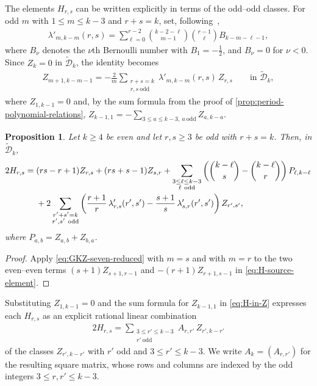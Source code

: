 \documentclass[12pt]{amsart}
\numberwithin{equation}{section}
\theoremstyle{plain}
\newtheorem{prop}[prop]{Proposition}
\newcommand{\odd}{\mathrm{odd}}
\newcommand{\Dtk}{\widetilde{\mathcal D}_k}
\begin{document}
The elements $H_{r,s}$ can be written explicitly in terms of the
odd--odd classes. For odd $m$ with $1\leq m\leq k-3$ and $r+s=k$, set,
following~\cite{GKZ},
\begin{align}\label{eq:lambda-prime}
 \lambda'_{m,k-m}(r,s)
 =\sum_{\ell=0}^{r-2}
 \binom{k-2-\ell}{m-1}\binom{r-1}{\ell}B_{k-m-\ell-1},
\end{align}
where $B_\nu$ denotes the $\nu$th Bernoulli number with
$B_1=-\frac12$, and $B_\nu=0$ for $\nu<0$. Since $Z_k=0$ in $\Dtk$,
the identity \cite[(7)]{GKZ} becomes
\begin{align}\label{eq:GKZ-seven-reduced}
 Z_{m+1,k-m-1}
 =-\frac{2}{m}
 \sum_{\substack{r+s=k\\r,s\ \odd}}
 \lambda'_{m,k-m}(r,s)\,Z_{r,s}
 \qquad\text{in }\Dtk,
\end{align}
where $Z_{1,k-1}=0$ and, by the sum formula from the proof of
\cref{prop:period-polynomial-relations},
$Z_{k-1,1}=-\sum_{3\leq a\leq k-3,\ a\ \odd}Z_{a,k-a}$.

\begin{prop}\label{prop:H-in-Z}
Let $k\geq4$ be even and let $r,s\geq3$ be odd with $r+s=k$. Then, in
$\Dtk$,
\begin{align}\label{eq:H-in-Z}
 2H_{r,s}
 ={}&(rs-r+1)Z_{r,s}+(rs+s-1)Z_{s,r}
 +\sum_{\substack{3\leq\ell\leq k-3\\\ell\ \odd}}
 \left(\binom{k-\ell}{s}-\binom{k-\ell}{r}\right)P_{\ell,k-\ell}
 \notag\\
 &+2\sum_{\substack{r'+s'=k\\r',s'\ \odd}}
 \left(\frac{r+1}{r}\,\lambda'_{r,s}(r',s')
      -\frac{s+1}{s}\,\lambda'_{s,r}(r',s')\right)Z_{r',s'},
\end{align}
where $P_{a,b}=Z_{a,b}+Z_{b,a}$.
\end{prop}

\begin{proof}
Apply \eqref{eq:GKZ-seven-reduced} with $m=s$ and with $m=r$ to the two
even--even terms $(s+1)Z_{s+1,r-1}$ and $-(r+1)Z_{r+1,s-1}$ in
\eqref{eq:H-source-element}.
\end{proof}

Substituting $Z_{1,k-1}=0$ and the sum formula for $Z_{k-1,1}$ in
\eqref{eq:H-in-Z} expresses each $H_{r,s}$ as an explicit rational
linear combination
\begin{align}\label{eq:H-in-Z-matrix}
 2H_{r,s}=\sum_{\substack{3\leq r'\leq k-3\\r'\ \odd}}
 A_{r,r'}\,Z_{r',k-r'}
\end{align}
of the classes $Z_{r',k-r'}$ with $r'$ odd and $3\leq r'\leq k-3$. We
write $A_k=(A_{r,r'})$ for the
resulting square matrix, whose rows and columns are indexed by the
odd integers $3\leq r,r'\leq k-3$.
\end{document}
